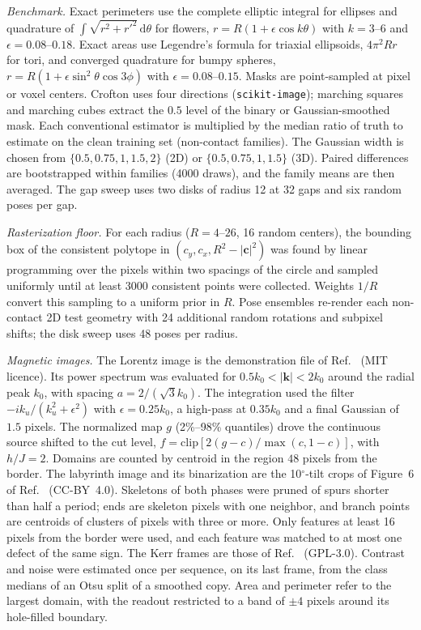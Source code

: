 \documentclass[11pt,a4paper]{article}
\newcommand{\dd}{\mathrm{d}}
\begin{document}
\emph{Benchmark.} Exact perimeters use the complete elliptic integral for ellipses and quadrature of $\int\sqrt{r^2+r'^2}\,\dd\theta$ for flowers, $r=R(1+\epsilon\cos k\theta)$ with $k=3$--$6$ and $\epsilon=0.08$--$0.18$. Exact areas use Legendre's formula for triaxial ellipsoids, $4\pi^2Rr$ for tori, and converged quadrature for bumpy spheres, $r=R(1+\epsilon\sin^2\theta\cos3\phi)$ with $\epsilon=0.08$--$0.15$. Masks are point-sampled at pixel or voxel centers. Crofton uses four directions (\texttt{scikit-image}); marching squares and marching cubes extract the $0.5$ level of the binary or Gaussian-smoothed mask. Each conventional estimator is multiplied by the median ratio of truth to estimate on the clean training set (non-contact families). The Gaussian width is chosen from $\{0.5,0.75,1,1.5,2\}$ (2D) or $\{0.5,0.75,1,1.5\}$ (3D). Paired differences are bootstrapped within families (4000 draws), and the family means are then averaged. The gap sweep uses two disks of radius 12 at 32 gaps and six random poses per gap.

\emph{Rasterization floor.} For each radius ($R=4$--$26$, 16 random centers), the bounding box of the consistent polytope in $(c_y,c_x,R^2-|\bm c|^2)$ was found by linear programming over the pixels within two spacings of the circle and sampled uniformly until at least $3000$ consistent points were collected. Weights $1/R$ convert this sampling to a uniform prior in $R$. Pose ensembles re-render each non-contact 2D test geometry with 24 additional random rotations and subpixel shifts; the disk sweep uses 48 poses per radius.

\emph{Magnetic images.} The Lorentz image is the demonstration file of Ref.~\cite{McCray2024} (MIT licence). Its power spectrum was evaluated for $0.5k_0<|\bm k|<2k_0$ around the radial peak $k_0$, with spacing $a=2/(\sqrt3k_0)$. The integration used the filter $-ik_u/(k_u^2+\epsilon^2)$ with $\epsilon=0.25k_0$, a high-pass at $0.35k_0$ and a final Gaussian of $1.5$ pixels. The normalized map $g$ (2\%--98\% quantiles) drove the continuous source shifted to the cut level, $f=\mathrm{clip}[2(g-c)/\max(c,1-c)]$, with $h/J=2$. Domains are counted by centroid in the region $48$ pixels from the border. The labyrinth image and its binarization are the 10$^\circ$-tilt crops of Figure~6 of Ref.~\cite{Zhao2026} (CC-BY~4.0). Skeletons of both phases were pruned of spurs shorter than half a period; ends are skeleton pixels with one neighbor, and branch points are centroids of clusters of pixels with three or more. Only features at least 16 pixels from the border were used, and each feature was matched to at most one defect of the same sign. The Kerr frames are those of Ref.~\cite{KerrPy} (GPL-3.0). Contrast and noise were estimated once per sequence, on its last frame, from the class medians of an Otsu split of a smoothed copy. Area and perimeter refer to the largest domain, with the readout restricted to a band of $\pm4$ pixels around its hole-filled boundary.
\end{document}
